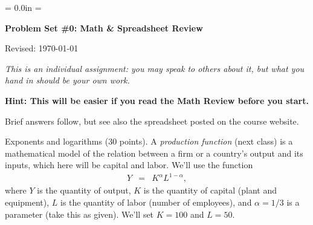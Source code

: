 \documentclass[12pt]{exam}
\def\HeadName{Problem Set \#0}
\begin{document}
\parindent = 0.0in
\parskip = \bigskipamount
\thispagestyle{empty}%
\Head

\centerline{\large \bf \HeadName: Math \& Spreadsheet Review}
\centerline{Revised:  \today}

\medskip
{\it This is an individual assignment:  you may speak to others about it,
but what you hand in should be your own work.}

{\bf Hint:  This will be easier if you read the Math Review before you start.}

\begin{questions}

\begin{solution}
Brief answers follow,
but see also the spreadsheet posted on the course website.
\end{solution}

\question Exponents and logarithms (30 points).
A {\it production function\/} (next class) is a mathematical
model of the relation between a firm or a country's output
and its inputs, which here will be capital and labor.
We'll use the function
\begin{eqnarray}
    Y &=& K^\alpha L^{1-\alpha} ,
    \label{eq:production}
\end{eqnarray}
where $Y$ is the quantity of output,
$K$ is the quantity of capital (plant and equipment),
$L$ is the quantity of labor (number of employees),
and $\alpha = 1/3$ is a parameter (take this as given).
We'll set $K=100$ and $L = 50$.

\end{questions}
\end{document}
